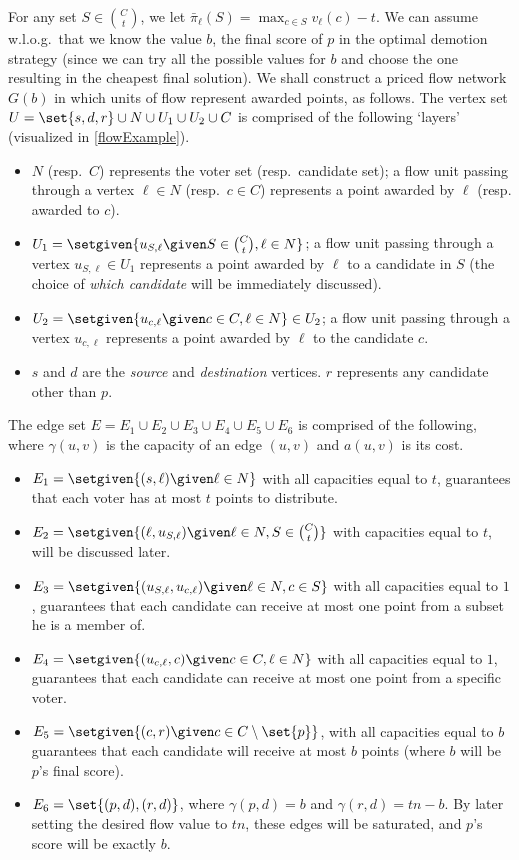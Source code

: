 \documentclass[letterpaper]{article} %
\newcommand{\Cmp}{C \setminus \set{p}}
\begin{document}
For any set $S \in \binom{C}{t}$, we let $\bar{\pi}_{\ell}(S)=\max_{c \in S}v_\ell(c)-t$.
We can assume w.l.o.g.\ that we know the value $b$, the final score of $p$ in the optimal demotion strategy (since we can try all the possible values for $b$ and choose the one resulting in the cheapest final solution). 
We shall construct a priced flow network $G(b)$ in which units of flow represent awarded points, as follows. The vertex set  $U = \set{s,d,r} \cup N \cup U_1 \cup U_2 \cup C$ is comprised of the following `layers' (visualized in \cref{flowExample}). 
\begin{itemize}
    \item $N$ (resp.\ $C$) represents the voter set (resp.\ candidate set); a flow unit passing through a vertex $\ell \in N$ (resp.\ $c \in C$) represents a point awarded by $\ell$ (resp. awarded to $c$).
    \item $U_1 = \setgiven{u_{S,\ell} \given S \in \binom{C}{t}, \ell \in N}$; a flow unit passing through a vertex $u_{S,\ell} \in U_1$ represents a point awarded by $\ell$ to a candidate in $S$ (the choice of \emph{which candidate} will be immediately discussed).
    \item $U_2 = \setgiven{u_{c,\ell} \given c \in C, \ell \in N} \in U_2$; a flow unit passing through a vertex $u_{c,\ell}$ represents a point awarded by $\ell$ to the candidate $c$.
    \item $s$ and $d$ are the \emph{source} and \emph{destination} vertices. $r$ represents any candidate other than $p$.
\end{itemize}
The edge set $E=E_1 \cup E_2 \cup E_3 \cup E_4 \cup E_5 \cup E_6$ is comprised of the following, where $\gamma(u,v)$ is the capacity of an edge $(u,v)$ and  $a(u,v)$ is its cost.
\begin{itemize}
    \item $E_1=\setgiven{(s,\ell) \given \ell \in N}$ with all capacities equal to $t$, guarantees that each voter has at most $t$ points to distribute.
    \item $E_2= \setgiven{(\ell, u_{S,\ell})\given \ell \in N, S \in \binom{C}{t}}$ with capacities equal to $t$, will be discussed later.
    \item $E_3=\setgiven{(u_{S,\ell}, u_{c,\ell})\given \ell \in N, c \in S}$ with all capacities equal to $1$, guarantees that each candidate can receive at most one point from a subset he is a member of.
    \item $E_4= \setgiven{(u_{c,\ell},c) \given c \in C, \ell \in N}$ with all capacities equal to $1$, guarantees that each candidate can receive at most one point from a specific voter.
    \item $E_5= \setgiven{(c,r) \given c \in \Cmp}$, with all capacities equal to $b$ guarantees that each candidate will receive at most $b$ points (where $b$ will be $p$'s final score).
    \item $E_6= \set{(p,d),(r,d)}$, where $\gamma(p,d)=b$ and $\gamma(r,d)=tn-b$. By later setting the desired flow value to $tn$, these edges will be saturated, and $p$'s score will be exactly $b$. 
\end{itemize}
\end{document}
